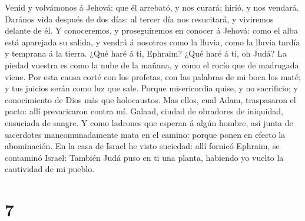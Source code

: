  Venid y volvámonos á Jehová: que él arrebató, y nos
curará; hirió, y nos vendará.  Darános vida después de dos
días: al tercer día nos resucitará, y viviremos delante de él.
 Y conoceremos, y proseguiremos en conocer á Jehová: como
el alba está aparejada su salida, y vendrá á nosotros como la lluvia,
como la lluvia tardía y temprana á la tierra.  ¿Qué haré á
ti, Ephraim? ¿Qué haré á ti, oh Judá? La piedad vuestra es como la nube
de la mañana, y como el rocío que de madrugada viene.  Por
esta causa corté con los profetas, con las palabras de mi boca los maté;
y tus juicios serán como luz que sale.  Porque
misericordia quise, y no sacrificio; y conocimiento de Dios más que
holocaustos.  Mas ellos, cual Adam, traspasaron el pacto:
allí prevaricaron contra mí.  Galaad, ciudad de obradores
de iniquidad, ensuciada de sangre.  Y como ladrones que
esperan á algún hombre, así junta de sacerdotes mancomunadamente mata en
el camino: porque ponen en efecto la abominación.  En la
casa de Israel he visto suciedad: allí fornicó Ephraim, se contaminó
Israel:  También Judá puso en ti una planta, habiendo yo
vuelto la cautividad de mi pueblo.

\hypertarget{section-6}{%
\section{7}\label{section-6}}

